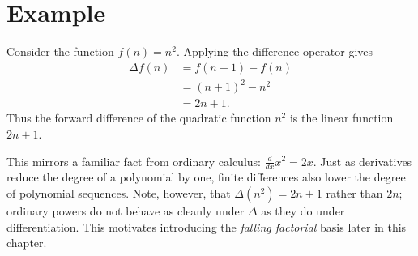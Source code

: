 \section*{Example}

Consider the function \(f(n) = n^2\). Applying the difference operator gives
\[
\begin{aligned}
\Delta f(n)
&= f(n+1) - f(n) \\
&= (n+1)^2 - n^2 \\
&= 2n + 1.
\end{aligned}
\]
Thus the forward difference of the quadratic function \(n^2\) is the linear
function \(2n+1\).

\begin{remark*}
This mirrors a familiar fact from ordinary calculus: \(\tfrac{d}{dx} x^2 = 2x\).
Just as derivatives reduce the degree of a polynomial by one,
finite differences also lower the degree of polynomial sequences.
Note, however, that \(\Delta(n^2) = 2n+1\) rather than \(2n\); ordinary
powers do not behave as cleanly under \(\Delta\) as they do under
differentiation. This motivates introducing the \emph{falling factorial}
basis later in this chapter.
\end{remark*}
